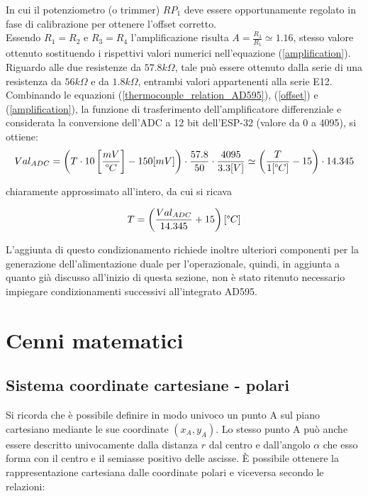 \documentclass[12pt]{article}
\begin{document}
        In cui il potenziometro (o trimmer) $RP_1$ deve essere opportunamente regolato in fase di calibrazione per ottenere l'offset corretto.\\
        Essendo $R_1=R_2$ e $R_3=R_4$ l'amplificazione risulta $A = \frac{R_3}{R_1} \simeq 1.16$, stesso valore ottenuto sostituendo i rispettivi valori numerici nell'equazione (\ref{amplification}). Riguardo alle due resistenze da $57.8 k\Omega$, tale può essere ottenuto dalla serie di una resistenza da $56 k\Omega$ e da $1.8 k\Omega$, entrambi valori appartenenti alla serie E12.\\
        Combinando le equazioni (\ref{thermocouple_relation_AD595}), (\ref{offset}) e (\ref{amplification}), la funzione di trasferimento dell'amplificatore differenziale e considerata la conversione dell'ADC a 12 bit dell'ESP-32 (valore da 0 a 4095), si ottiene:
        \begin{equation}
            Val_{ADC} = \left( T \cdot 10 \left[ \frac{mV}{\degree C} \right] - 150 [mV] \right) \cdot \frac{57.8}{50} \cdot \frac{4095}{3.3[V]} \simeq \left( \frac{T}{1 [\degree C]} - 15 \right) \cdot  14.345
        \end{equation}
        
        \noindent
        chiaramente approssimato all'intero, da cui si ricava
        
        \begin{equation}
            T = \left( \frac{Val_{ADC}}{14.345} + 15 \right) [\degree C]
        \end{equation}
    
        \noindent
        L'aggiunta di questo condizionamento richiede inoltre ulteriori componenti per la generazione dell'alimentazione duale per l'operazionale, quindi, in aggiunta a quanto già discusso all'inizio di questa sezione, non è stato ritenuto necessario impiegare condizionamenti successivi all'integrato AD595.

\newpage
\section{Cenni matematici}
    \subsection{Sistema coordinate cartesiane - polari}
    Si ricorda che è possibile definire in modo univoco un punto A sul piano cartesiano mediante le sue coordinate $(x_A, y_A)$. Lo stesso punto A può anche essere descritto univocamente dalla distanza $r$ dal centro e dall'angolo $\alpha$ che esso forma con il centro e il semiasse positivo delle ascisse. È possibile ottenere la rappresentazione cartesiana dalle coordinate polari e viceversa secondo le relazioni:
    
\end{document}
